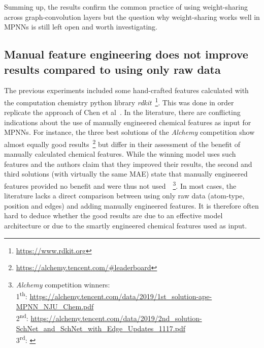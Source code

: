 Summing up, the results confirm the common practice of using weight-sharing across graph-convolution layers but the question why weight-sharing works well in MPNNs is still left open and worth investigating.


\subsection{Manual feature engineering does not improve results compared to using only raw data}
\label{sec:raw-data}

The previous experiments included some hand-crafted features calculated with the computation chemistry python library \textit{rdkit}~\footnote{\url{https://www.rdkit.org}}. This was done in order replicate the approach of Chen et al~\cite{Chen2019}. In the literature, there are conflicting indications about the use of manually engineered chemical features as input for MPNNs. For instance, the three best solutions of the \textit{Alchemy} competition show almost equally good results~\footnote{\url{https://alchemy.tencent.com/\#leaderboard}} but differ in their assessment of the benefit of manually calculated chemical features. While the winning model uses such features and the authors claim that they improved their results, the second and third solutions (with virtually the same MAE) state that manually engineered features provided no benefit and were thus not used~\cite{Klicpera2019}~\footnote{
\textit{Alchemy} competition winners: \\
	1\textsuperscript{th}: \url{https://alchemy.tencent.com/data/2019/1st_solution-ape-MPNN_NJU_Chem.pdf} \\
	2\textsuperscript{nd}: \url{https://alchemy.tencent.com/data/2019/2nd_solution-SchNet_and_SchNet_with_Edge_Updates_1117.pdf}\\
	3\textsuperscript{rd}: \cite{Klicpera2019}
}.
In most cases, the literature lacks a direct comparison between using only raw data (atom-type, position and edges) and adding manually engineered features. It is therefore often hard to deduce whether the good results are due to an effective model architecture or due to the smartly engineered chemical features used as input.


